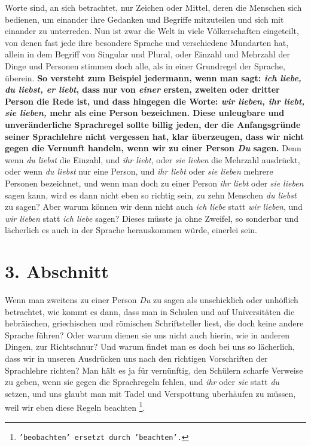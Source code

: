  Worte sind, an sich betrachtet, nur Zeichen oder
Mittel, deren die Menschen sich
bedienen, um einander ihre Gedanken und Begriffe mitzuteilen und sich mit
einander zu unterreden. Nun ist zwar die Welt in viele Völkerschaften
eingeteilt, von denen fast jede ihre besondere Sprache und verschiedene
Mundarten hat, allein in dem Begriff von Singular und Plural, oder
Einzahl und Mehrzahl der Dinge und Personen stimmen doch alle, als in
einer Grundregel der Sprache, überein. \textbf{So versteht zum Beispiel jedermann, wenn
man
sagt: \textit{ich liebe, du liebst, er liebt}, dass nur von \textit{einer}
ersten, zweiten
oder dritter Person die Rede ist, und dass hingegen die Worte: \textit{wir
lieben, ihr
liebt, sie lieben,} mehr als eine Person bezeichnen. Diese unleugbare und
unveränderliche Sprachregel sollte billig jeden, der die Anfangsgründe seiner
Sprachlehre nicht vergessen hat, klar überzeugen, dass wir nicht gegen die
Vernunft handeln, wenn wir zu einer Person \textit{Du} sagen.} Denn wenn
\textit{du
liebst} die Einzahl, und \textit{ihr liebt}, oder \textit{sie lieben} die
Mehrzahl
ausdrückt, oder wenn \textit{du liebst} nur eine Person, und \textit{ihr
liebt} oder
\textit{sie lieben} mehrere Personen bezeichnet, und wenn man doch zu einer
Person
\textit{ihr liebt} oder \textit{sie lieben} sagen kann, wird es dann nicht eben
so
richtig sein, zu zehn Menschen \textit{du liebst} zu sagen? Aber warum können
wir
denn nicht auch \textit{ich liebe} statt \textit{wir lieben}, und \textit{wir
lieben} statt
\textit{ich liebe} sagen? Dieses müsste ja ohne Zweifel, so sonderbar und
lächerlich
es auch in der Sprache herauskommen würde, einerlei sein.

\section{3. Abschnitt} \label{kap10_ab3}

Wenn man zweitens zu einer Person \textit{Du} zu sagen als unschicklich oder
unhöflich betrachtet, wie kommt es dann, dass man in Schulen und auf
Universitäten die hebräischen, griechischen und römischen Schriftsteller liest,
die doch keine andere Sprache führen? Oder warum dienen sie uns nicht auch
hierin, wie in anderen Dingen, zur Richtschnur? Und warum findet man es doch bei
uns so lächerlich, dass wir in unseren Ausdrücken uns nach den richtigen
Vorschriften der Sprachlehre richten? Man hält es ja für vernünftig, den
Schülern scharfe Verweise zu geben, wenn sie gegen die Sprachregeln fehlen, und
\textit{ihr} oder \textit{sie} statt \textit{du} setzen, und uns glaubt man mit
Tadel und Verspottung
uberhäufen zu müssen, weil wir eben diese Regeln beachten
\footnote{\texttt{'beobachten' ersetzt durch 'beachten'.}}.

